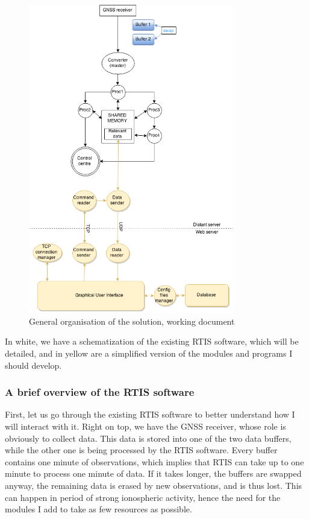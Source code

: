 \documentclass{themeensg}
\begin{document}
\begin{figure}[!ht]
	\centering
	\includegraphics[width=0.8\textwidth]{global_flowchart}
	\caption{General organisation of the solution, working document}
\end{figure}

In white, we have a schematization of the existing RTIS software, which will be detailed, and in yellow are a simplified version of the modules and programs I should develop.

\subsubsection{A brief overview of the RTIS software}

First, let us go through the existing RTIS software to better understand how I will interact with it. Right on top, we have the GNSS receiver, whose role is obviously to collect data. This data is stored into one of the two data buffers, while the other one is being processed by the RTIS software. Every buffer contains one minute of observations, which implies that RTIS can take up to one minute to process one minute of data. If it takes longer, the buffers are swapped anyway, the remaining data is erased by new observations, and is thus lost. This can happen in period of strong ionospheric activity, hence the need for the modules I add to take as few resources as possible.
\end{document}
